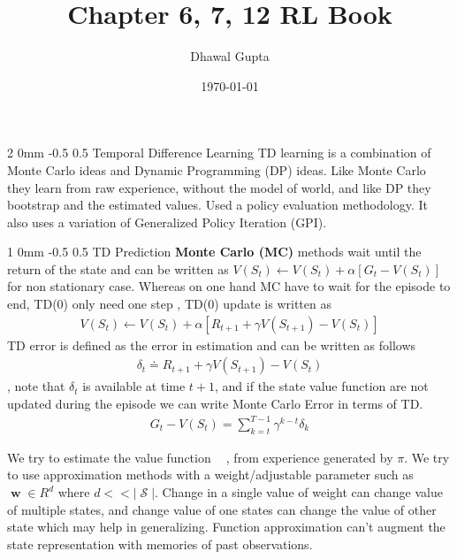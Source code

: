 \documentclass[twocolumn,11pt]{article}
\title{Chapter 6, 7, 12 RL Book \cite{sutton2018reinforcement}}
\author{Dhawal Gupta}
\date{\today}
\makeatletter
\DeclareMathOperator{\w}{\textbf{w}}
\DeclareMathOperator{\state}{\mathcal{S}}
\DeclareMathOperator{\vp}{v_\pi} %
\renewcommand{\section}{\@startsection
{section}%
{2}%
{0mm}%
{-0.5\baselineskip}%
{0.5\baselineskip}%
{\bfseries\color{blue}}} %
\renewcommand{\subsection}{\@startsection
{subsection}%
{1}%
{0mm}%
{-0.5\baselineskip}%
{0.5\baselineskip}%
{\bfseries\color{blue}}} %
\makeatother
\begin{document}
\maketitle


\section{Temporal Difference Learning}
TD learning is a combination of Monte Carlo ideas and Dynamic Programming (DP) ideas.  Like Monte Carlo they learn from raw experience, without the model of world, and like  DP they bootstrap and the estimated values. Used a policy evaluation methodology.  It also uses a variation of Generalized Policy Iteration (GPI). 
\subsection{TD Prediction}
\textbf{Monte Carlo (MC)} methods wait until the return of the state and can be written as $V(S_t) \leftarrow V(S_t) + \alpha [G_t - V(S_t)]$ for non stationary case. Whereas on one hand MC have to wait for the episode to end, TD(0) only need one step , TD(0) update is written as  \useshortskip
\begin{align*}
V(S_t) \leftarrow V(S_t) + \alpha [R_{t+1} + \gamma V(S_{t+1}) - V(S_t)]
\end{align*}
TD error is defined as the error in estimation and  can be written as follows \useshortskip
\begin{align*}
\delta_t \doteq R_{t+1} + \gamma V(S_{t+1}) - V(S_t)
\end{align*}, note that $\delta_t $ is available at time $t+1$, and if the state  value function  are not updated during the episode we  can write  Monte Carlo Error in terms of TD.\useshortskip
\begin{align*}
G_t - V(S_t)  = \sum_{k  = t}^{T -1} \gamma^{k  -t}\delta_k
\end{align*}





We try  to estimate the  value function $\vp$ ,  from experience generated by $\pi$. We try to use approximation methods with a weight/adjustable parameter such as $\w \in R^d$ where $d << |\state|$. Change in a single value of  weight  can  change value of multiple states, and change value of one states can change  the value of other state which  may help in generalizing. Function approximation can't augment the state representation with memories of past observations. 
\end{document}
